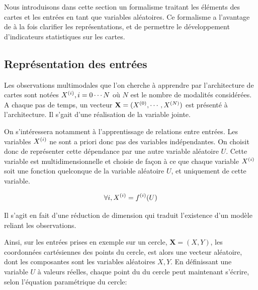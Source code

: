 Nous introduisons dans cette section un formalisme traitant les éléments des cartes et les entrées en tant que variables aléatoires. Ce formalisme a l'avantage de à la fois clarifier les représentations, et de permettre le développement d'indicateurs statistiques sur les cartes.

\subsection{Représentation des entrées}

Les observations multimodales que l'on cherche à apprendre par l'architecture de cartes sont notées ${X^{({i})}, i = 0 \cdots N}$ où $N$ est le nombre de modalités considérées. A chaque pas de temps, un vecteur $\mathbf{X} = (X^{({0})}, \cdots , X^{({N})})$ est présenté à l'architecture. Il s'gait d'une réalisation de la variable jointe.

On s'intéressera notamment à l'apprentissage de relations entre entrées. Les variables $X^{({i})}$ ne sont a priori donc pas des variables indépendantes. On choisit donc de représenter cette dépendance par une autre variable aléatoire $U$. Cette variable est multidimensionnelle et choisie de façon à ce que chaque variable $X^{({i})}$ soit une fonction quelconque de la variable aléatoire $U$, et uniquement de cette variable.

\begin{equation}
\forall i, X^{({i})} = f^{({i})}(U)
\label{eq:U}
\end{equation}

Il s'agit en fait d'une réduction de dimension qui traduit l'existence d'un modèle reliant les observations.

Ainsi, sur les entrées prises en exemple sur un cercle, $\mathbf{X} = (X,Y)$, les coordonnées cartésiennes des points du cercle, est alors une vecteur aléatoire, dont les composantes sont les variables aléatoires $X,Y$. En définissant une variable $U$ à valeurs réelles, chaque point du du cercle peut maintenant s'écrire, selon l'équation paramétrique du cercle: 

